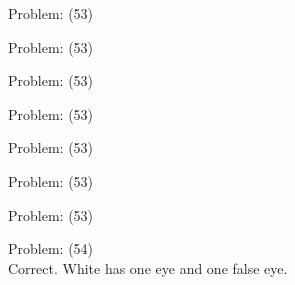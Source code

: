 \documentclass[11pt]{article}
\begin{document}
\begin{minipage}[t]{0.5\textwidth}
  {\centering
  
  Problem: (53)\\
  
  }
\end{minipage}
\begin{minipage}[t]{0.5\textwidth}
  {\centering
  
  Problem: (53)\\
  
  }
\end{minipage}
\begin{minipage}[t]{0.5\textwidth}
  {\centering
  
  Problem: (53)\\
  
  }
\end{minipage}
\begin{minipage}[t]{0.5\textwidth}
  {\centering
  
  Problem: (53)\\
  
  }
\end{minipage}
\begin{minipage}[t]{0.5\textwidth}
  {\centering
  
  Problem: (53)\\
  
  }
\end{minipage}
\begin{minipage}[t]{0.5\textwidth}
  {\centering
  
  Problem: (53)\\
  
  }
\end{minipage}
\begin{minipage}[t]{0.5\textwidth}
  {\centering
  
  Problem: (53)\\
  
  }
\end{minipage}
\begin{minipage}[t]{0.5\textwidth}
  {\centering
  
  Problem: (54)\\
  Correct. White has one eye and one false eye.\\
  }
\end{minipage}
\end{document}
